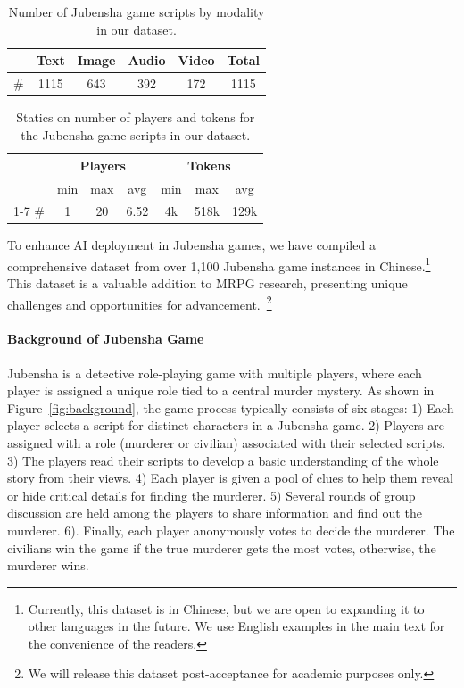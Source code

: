 \documentclass[11pt]{article}
\begin{document}
\begin{table}[h]
\centering
\begin{tabular}{lccccc}
\hline
       & Text & Image & Audio & Video & Total \\ \hline
\#  & 1115 & 643   & 392  & 172 & 1115   \\ \hline
\end{tabular}
\caption{Number of Jubensha game scripts by modality in our dataset.}
\label{tab:horizontal_dataset_statistics}
\end{table}
\vspace{-5mm}
\begin{table}[ht]
\begin{tabular}{ccccccc}
\hline
              & \multicolumn{3}{c}{Players} & \multicolumn{3}{c}{Tokens}                  \\ \hline
              & min        & max        & avg        & min    & max    & avg    \\ \cline{1-7}
\# &    1     &     20    &    6.52     & 4k    & 518k      & 129k                                 \\ \hline
\end{tabular}
\caption{Statics on number of players and tokens for the Jubensha game scripts in our dataset.}
\label{tab:dataset_statics1}
\vspace{-2mm}
\end{table}
To enhance AI deployment in Jubensha games, we have compiled a comprehensive dataset from over 1,100 Jubensha game instances in Chinese.\footnote{Currently, this dataset is in Chinese, but we are open to expanding it to other languages in the future. We use English examples in the main text for the convenience of the readers. } This dataset is a valuable addition to MRPG research,  presenting unique challenges and opportunities for advancement.~\footnote{We will release this dataset post-acceptance for academic purposes only.}

\paragraph{Background of Jubensha Game}
Jubensha is a detective role-playing game with multiple players, where each player is assigned a unique role tied to a central murder mystery. As shown in Figure~\ref{fig:background}, the game process typically consists of six stages: 1) Each player selects a script for distinct characters in a Jubensha game. 2) Players are assigned with a role (murderer or civilian) associated with their selected scripts. 3) The players read their scripts to develop a basic understanding of the whole story from their views. 4) Each player is given a pool of clues 
to help them reveal or hide critical details for finding the murderer. 5) Several rounds of group discussion are held among the players to share information and find out the murderer. 6). Finally, each player anonymously votes to decide the murderer. The civilians win the game if the true murderer gets the most votes, otherwise, the murderer wins.
\end{document}
